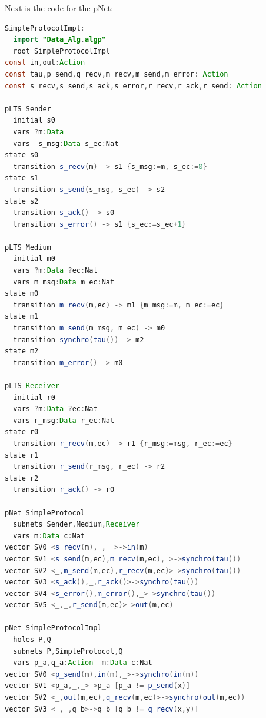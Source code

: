 \documentclass{elsarticle}
\begin{document}
Next is the code for the  pNet:
\medskip
\begin{lstlisting}[basicstyle=\scriptsize\ttfamily, language=java, frame=single]
SimpleProtocolImpl:
  import "Data_Alg.algp"
  root SimpleProtocolImpl
const in,out:Action
const tau,p_send,q_recv,m_recv,m_send,m_error: Action
const s_recv,s_send,s_ack,s_error,r_recv,r_ack,r_send: Action

pLTS Sender
  initial s0
  vars ?m:Data
  vars  s_msg:Data s_ec:Nat
state s0
  transition s_recv(m) -> s1 {s_msg:=m, s_ec:=0}
state s1
  transition s_send(s_msg, s_ec) -> s2 
state s2
  transition s_ack() -> s0
  transition s_error() -> s1 {s_ec:=s_ec+1}

pLTS Medium
  initial m0
  vars ?m:Data ?ec:Nat
  vars m_msg:Data m_ec:Nat
state m0
  transition m_recv(m,ec) -> m1 {m_msg:=m, m_ec:=ec}
state m1
  transition m_send(m_msg, m_ec) -> m0 
  transition synchro(tau()) -> m2
state m2
  transition m_error() -> m0

pLTS Receiver
  initial r0
  vars ?m:Data ?ec:Nat
  vars r_msg:Data r_ec:Nat
state r0
  transition r_recv(m,ec) -> r1 {r_msg:=msg, r_ec:=ec}
state r1
  transition r_send(r_msg, r_ec) -> r2
state r2
  transition r_ack() -> r0

pNet SimpleProtocol
  subnets Sender,Medium,Receiver
  vars m:Data c:Nat
vector SV0 <s_recv(m),_, _>->in(m)
vector SV1 <s_send(m,ec),m_recv(m,ec),_>->synchro(tau())
vector SV2 <_,m_send(m,ec),r_recv(m,ec)>->synchro(tau())
vector SV3 <s_ack(),_,r_ack()>->synchro(tau())
vector SV4 <s_error(),m_error(),_>->synchro(tau())
vector SV5 <_,_,r_send(m,ec)>->out(m,ec)

pNet SimpleProtocolImpl
  holes P,Q
  subnets P,SimpleProtocol,Q
  vars p_a,q_a:Action  m:Data c:Nat
vector SV0 <p_send(m),in(m),_>->synchro(in(m))
vector SV1 <p_a,_,_>->p_a [p_a != p_send(x)]
vector SV2 <_,out(m,ec),q_recv(m,ec)>->synchro(out(m,ec))
vector SV3 <_,_,q_b>->q_b [q_b != q_recv(x,y)]
\end{lstlisting}

\end{document}

